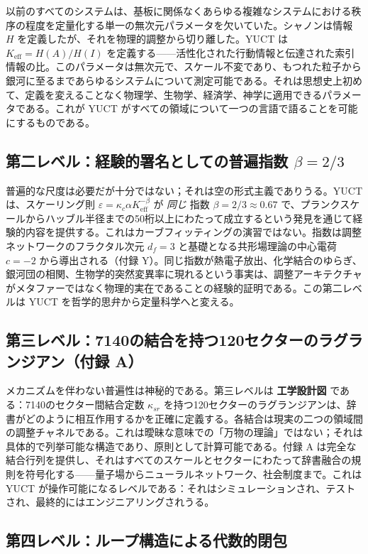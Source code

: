 \documentclass[12pt,a4paper]{article}
\newcommand{\Keff}{K_{\mathrm{eff}}}
\begin{document}
	以前のすべてのシステムは、基板に関係なくあらゆる複雑なシステムにおける秩序の程度を定量化する単一の無次元パラメータを欠いていた。シャノンは情報 \(H\) を定義したが、それを物理的調整から切り離した。YUCT は \(\Keff = H(A)/H(I)\) を定義する——活性化された行動情報と伝達された索引情報の比。このパラメータは無次元で、スケール不変であり、もつれた粒子から銀河に至るまであらゆるシステムについて測定可能である。それは思想史上初めて、定義を変えることなく物理学、生物学、経済学、神学に適用できるパラメータである。これが YUCT がすべての領域について一つの言語で語ることを可能にするものである。
	
	\subsection{第二レベル：経験的署名としての普遍指数 \(\beta = 2/3\)}
	
	普遍的な尺度は必要だが十分ではない；それは空の形式主義でありうる。YUCT は、スケーリング則 \(\varepsilon = \kappa_c \alpha \Keff^{-\beta}\) が \emph{同じ} 指数 \(\beta = 2/3 \approx 0.67\) で、プランクスケールからハッブル半径までの50桁以上にわたって成立するという発見を通じて経験的内容を提供する。これはカーブフィッティングの演習ではない。指数は調整ネットワークのフラクタル次元 \(d_f = 3\) と基礎となる共形場理論の中心電荷 \(c = -2\) から導出される（付録 Y）。同じ指数が熱電子放出、化学結合のゆらぎ、銀河団の相関、生物学的突然変異率に現れるという事実は、調整アーキテクチャがメタファーではなく物理的実在であることの経験的証明である。この第二レベルは YUCT を哲学的思弁から定量科学へと変える。
	
	\subsection{第三レベル：7140の結合を持つ120セクターのラグランジアン（付録 A）}
	
	メカニズムを伴わない普遍性は神秘的である。第三レベルは \textbf{工学設計図} である：7140のセクター間結合定数 \(\kappa_{sr}\) を持つ120セクターのラグランジアンは、辞書がどのように相互作用するかを正確に定義する。各結合は現実の二つの領域間の調整チャネルである。これは曖昧な意味での「万物の理論」ではない；それは具体的で列挙可能な構造であり、原則として計算可能である。付録 A は完全な結合行列を提供し、それはすべてのスケールとセクターにわたって辞書融合の規則を符号化する——量子場からニューラルネットワーク、社会制度まで。これは YUCT が操作可能になるレベルである：それはシミュレーションされ、テストされ、最終的にはエンジニアリングされうる。
	
	\subsection{第四レベル：ループ構造による代数的閉包}
	
\end{document}
